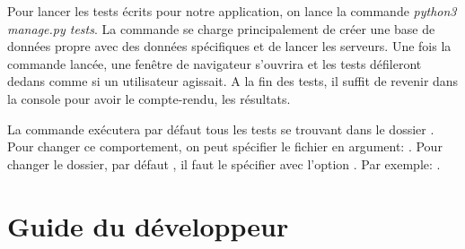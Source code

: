 \documentclass[a4paper,10pt,twoside]{sphinxmanual}
\begin{document}
Pour lancer les tests écrits pour notre application, on lance la commande \emph{python3 manage.py tests}. La commande se charge principalement de créer une base de données propre avec des données spécifiques et de lancer les serveurs. Une fois la commande lancée, une fenêtre de navigateur s'ouvrira et les tests défileront dedans comme si un utilisateur agissait. A la fin des tests, il suffit de revenir dans la console pour avoir le compte-rendu, les résultats.

La commande exécutera par défaut tous les tests se trouvant dans le dossier . Pour changer ce comportement, on peut spécifier le fichier en argument: . Pour changer le dossier, par défaut , il faut le spécifier avec l'option . Par exemple: .


\chapter{Guide du développeur}
\label{guide:guide-du-developpeur}\label{guide::doc}
\end{document}
